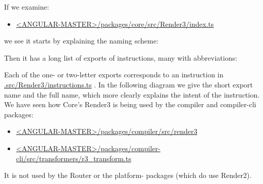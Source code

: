 If we examine:

\begin{itemize}
  \item \href{https://github.com/angular/angular/blob/master/packages/core/src/render3/index.ts}
        {<ANGULAR-MASTER>/packages/core/src/Render3/index.ts}
\end{itemize}

we see it starts by explaining the naming scheme:



Then it has a long list of exports of instructions, many with abbreviations:



Each of the one- or two-letter exports corresponds to an instruction in
\url{.src/Render3/instructions.ts}
. In the following diagram we give the short export name
and the full name, which more clearly explains the intent of the instruction. We have
seen how Core’s Render3 is being used by the compiler and compiler-cli packages:

\begin{itemize}
  \item \href{https://github.com/angular/angular/tree/master/packages/compiler/src/render3}
        {<ANGULAR-MASTER>/packages/compiler/src/render3}
  \item \href{https://github.com/angular/angular/blob/master/packages/compiler-cli/src/transformers/r3_transform.ts}
        {<ANGULAR-MASTER>/packages/compiler-cli/src/transformers/r3\_transform.ts}
\end{itemize}

It is not used by the Router or the platform- packages (which do use  Render2).
